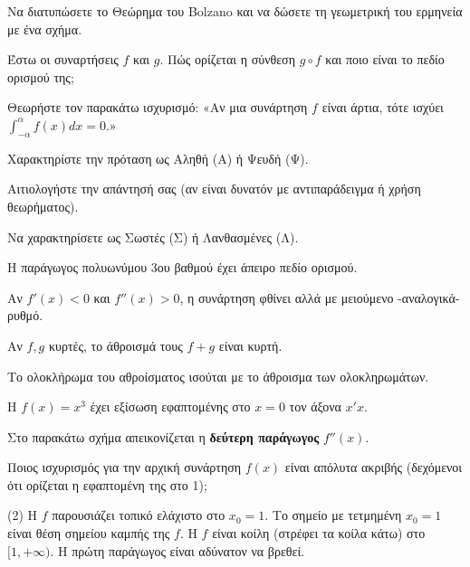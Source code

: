 \documentclass[11pt,a4paper]{article}
\newcommand{\kerkissans}[1]{{\fontfamily{maksf}\selectfont \textbf{#1}}}
\renewcommand{\textdexiakeraia}{}
\newcommand{\dint}{\displaystyle\int}
\newcommand\themanum{A}
\newcounter{thema}[section]
\renewcommand{\thethema}{\arabic{thema}}
\newcommand{\Thema}{\refstepcounter{thema}{\textbf{\textcolor{black}{\faPenSquare\ \  \large \kerkissans{\textbf{\thethemaο\hspace{2mm}Διαγώνισμα - Θέμα \themanum}}}}}\hspace{0mm}}{}
\newenvironment{thema}[1]
{\begin{tcolorbox}[title=\Thema\kerkissans{\textbf{\large{  #1}}},breakable,
enhanced standard,titlerule=0pt,toprule=0pt, rightrule=0pt, bottomrule=0pt,
colback=white,left=0mm,top=1mm,bottom=0mm,
boxrule=0pt,
colframe=white,leftrule=0mm,sharp corners,coltitle=black]
\renewcommand{\themanum}{#1}}
{\end{tcolorbox}}
\begin{document}
\begin{thema}{A}
\begin{erwthma}
    \item Να διατυπώσετε το Θεώρημα του Bolzano και να δώσετε τη γεωμετρική του ερμηνεία με ένα σχήμα.
    \item Έστω οι συναρτήσεις $f$ και $g$. Πώς ορίζεται η σύνθεση $g \circ f$ και ποιο είναι το πεδίο ορισμού της;
    \item Θεωρήστε τον παρακάτω ισχυρισμό:
    «Αν μια συνάρτηση $f$ είναι άρτια, τότε ισχύει $\dint_{-\alpha}^\alpha f(x) dx = 0$.»
    \begin{alist}
    \item Χαρακτηρίστε την πρόταση ως Αληθή (Α) ή Ψευδή (Ψ).
    \item Αιτιολογήστε την απάντησή σας (αν είναι δυνατόν με αντιπαράδειγμα ή χρήση θεωρήματος).
    \end{alist}
    \item Να χαρακτηρίσετε ως Σωστές (Σ) ή Λανθασμένες (Λ).
    \begin{alist}
        \item Η παράγωγος πολυωνύμου 3ου βαθμού έχει άπειρο πεδίο ορισμού.
        \item Αν $f'(x) < 0$ και $f''(x) > 0$, η συνάρτηση φθίνει αλλά με μειούμενο -αναλογικά- ρυθμό.
        \item Αν $f, g$ κυρτές, το άθροισμά τους $f+g$ είναι κυρτή.
        \item Το ολοκλήρωμα του αθροίσματος ισούται με το άθροισμα των ολοκληρωμάτων.
        \item Η $f(x)=x^3$ έχει εξίσωση εφαπτομένης στο $x=0$ τον άξονα $x'x$.
    \end{alist}
    \item Στο παρακάτω σχήμα απεικονίζεται η \textbf{δεύτερη παράγωγος} $f''(x)$. 
    \begin{center}
    \end{center}
    Ποιος ισχυρισμός για την αρχική συνάρτηση $f(x)$ είναι απόλυτα ακριβής (δεχόμενοι ότι ορίζεται η εφαπτομένη της στο 1);
    \begin{tasks}[label=\let\textdexiakeraia\relax\alph*.](2)
        \task Η $f$ παρουσιάζει τοπικό ελάχιστο στο $x_0 = 1$.
        \task Το σημείο με τετμημένη $x_0 = 1$ είναι θέση σημείου καμπής της $f$.
        \task Η $f$ είναι κοίλη (στρέφει τα κοίλα κάτω) στο $[1, +\infty)$.
        \task Η πρώτη παράγωγος είναι αδύνατον να βρεθεί.
    \end{tasks}
\end{erwthma}
\end{thema}
\vspace{1cm}
\end{document}
